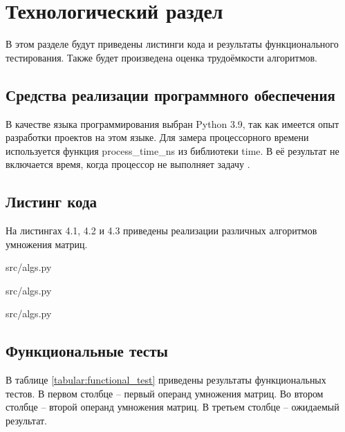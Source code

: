 \chapter{Технологический раздел}
В этом разделе будут приведены листинги кода и результаты функционального тестирования.
Также будет произведена оценка трудоёмкости алгоритмов.

\section{Средства реализации программного обеспечения}
В качестве языка программирования выбран Python 3.9, так как имеется опыт разработки проектов на этом языке.
Для замера процессорного времени используется функция process\_time\_ns из библиотеки time. 
В её результат не включается время, когда процессор не выполняет задачу \cite{python}. 

\section{Листинг кода}
\FloatBarrier
На листингах 4.1, 4.2 и 4.3 приведены реализации различных алгоритмов умножения матриц.
\begin{lstinputlisting}[language=Python, caption=Реализация алгоритма классического умножения матриц, linerange={11-25}, 
	basicstyle=\small\sffamily, frame=single]{src/algs.py}
\end{lstinputlisting}
\FloatBarrier

\FloatBarrier
\begin{lstinputlisting}[language=Python, caption=Реализация алгоритма Винограда, linerange={27-66}, 
	basicstyle=\small\sffamily, frame=single]{src/algs.py}
\end{lstinputlisting}
\FloatBarrier

\FloatBarrier
\begin{lstinputlisting}[language=Python, caption=Реализация оптимизированного алгоритма Винограда, linerange={68-105}, 
	basicstyle=\small\sffamily, frame=single]{src/algs.py}
\end{lstinputlisting}
\FloatBarrier

\section{Функциональные тесты}
В таблице \ref{tabular:functional_test} приведены результаты функциональных тестов. 
В первом столбце -- первый операнд умножения матриц.
Во втором столбце -- второй операнд умножения матриц.
В третьем столбце -- ожидаемый результат.

